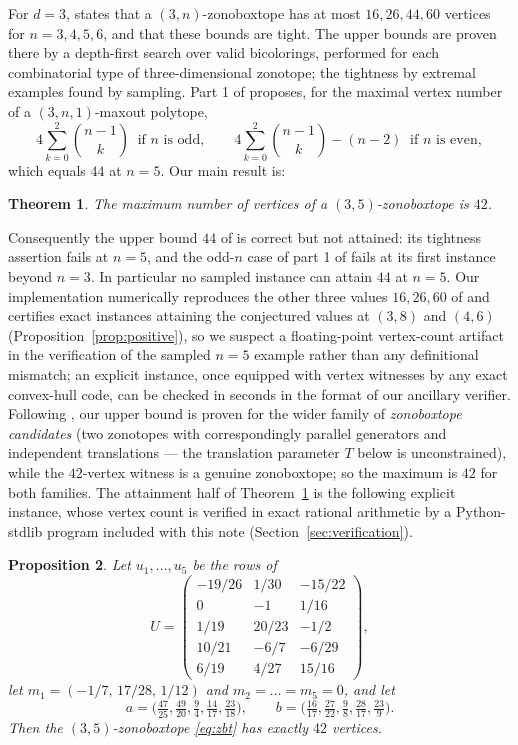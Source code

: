 \documentclass[11pt]{amsart}
\newtheorem{theorem}{Theorem}
\newtheorem{proposition}[theorem]{Proposition}
\theoremstyle{remark}
\begin{document}
For $d=3$, \cite[Proposition 6.5]{BCLS} states that a
$(3,n)$-zonoboxtope has at most $16, 26, 44, 60$ vertices for
$n=3,4,5,6$, and that these bounds are tight. The upper bounds are
proven there by a depth-first search over valid bicolorings, performed
for each combinatorial type of three-dimensional zonotope; the
tightness by extremal examples found by sampling. Part 1 of \cite[Conjecture 6.6]{BCLS} proposes, for the
maximal vertex number of a $(3,n,1)$-maxout polytope,
\[
  4\sum_{k=0}^{2}\binom{n-1}{k} \ \text{ if } n \text{ is odd},
  \qquad
  4\sum_{k=0}^{2}\binom{n-1}{k} - (n-2) \ \text{ if } n \text{ is even},
\]
which equals $44$ at $n=5$. Our main result is:

\begin{theorem}\label{thm:main}
The maximum number of vertices of a $(3,5)$-zonoboxtope is $42$.
\end{theorem}

Consequently the upper bound $44$ of \cite[Proposition 6.5]{BCLS} is
correct but not attained: its tightness assertion fails at $n=5$, and
the odd-$n$ case of part 1 of \cite[Conjecture 6.6]{BCLS} fails at its
first instance beyond $n=3$. In particular no sampled instance can
attain $44$ at $n=5$. Our implementation numerically reproduces the
other three values $16, 26, 60$ of \cite[Proposition 6.5]{BCLS} and
certifies exact instances attaining the conjectured values at $(3,8)$
and $(4,6)$ (Proposition~\ref{prop:positive}), so we suspect a
floating-point vertex-count artifact in the verification of the
sampled $n=5$ example rather than any definitional mismatch; an
explicit instance, once equipped with vertex witnesses by any exact
convex-hull code, can be checked in seconds in the format of our
ancillary verifier. Following \cite[Remark 6.7]{BCLS}, our upper bound
is proven for the wider family of \emph{zonoboxtope candidates} (two
zonotopes with correspondingly parallel generators and independent
translations --- the translation parameter $T$ below is
unconstrained), while the $42$-vertex witness is a genuine
zonoboxtope; so the maximum is $42$ for both families. The attainment
half of Theorem~\ref{thm:main} is
the following explicit instance, whose vertex count is verified in
exact rational arithmetic by a Python-stdlib program included with this
note (Section~\ref{sec:verification}).

\begin{proposition}\label{prop:instance}
Let $u_1,\dots,u_5$ be the rows of
\[
U=\begin{pmatrix}
-19/26 & 1/30 & -15/22\\
0 & -1 & 1/16\\
1/19 & 20/23 & -1/2\\
10/21 & -6/7 & -6/29\\
6/19 & 4/27 & 15/16
\end{pmatrix},
\]
let $m_1 = (-1/7,\, 17/28,\, 1/12)$ and $m_2=\dots=m_5=0$, and let
\[
a = \bigl(\tfrac{47}{25}, \tfrac{49}{20}, \tfrac94, \tfrac{14}{17}, \tfrac{23}{18}\bigr),
\qquad
b = \bigl(\tfrac{16}{17}, \tfrac{27}{22}, \tfrac98, \tfrac{28}{17}, \tfrac{23}{9}\bigr).
\]
Then the $(3,5)$-zonoboxtope \eqref{eq:zbt} has exactly $42$ vertices.
\end{proposition}
\end{document}
